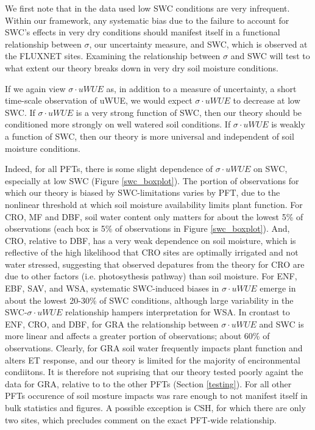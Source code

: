 \documentclass[draft,linenumbers]{agujournal}
\begin{document}
We first note that in the data used low SWC conditions are very infrequent. Within our framework, any systematic bias due to the  failure to account for SWC's effects in very dry conditions should manifest itself in a functional relationship between $\sigma$, our uncertainty measure, and SWC, which is observed at the FLUXNET sites. Examining the relationship between $\sigma$ and SWC will test to what extent our theory breaks down in very dry soil moisture conditions.

If we again view $\sigma \cdot uWUE$ as, in addition to a measure of uncertainty, a short time-scale observation of uWUE, we would expect $\sigma \cdot uWUE$ to decrease at low SWC. If $\sigma \cdot uWUE$ is a very strong function of SWC, then our theory should be conditioned more strongly on well watered soil conditions. If $\sigma \cdot uWUE$ is weakly a function of SWC, then our theory is more universal and independent of soil moisture conditions.

Indeed, for all PFTs, there is some slight dependence of $\sigma \cdot uWUE$ on SWC, especially at low SWC (Figure \ref{swc_boxplot}). The portion of observations for which our theory is biased by SWC-limitations varies by PFT, due to the nonlinear threshold at which soil moisture availability limits plant function. For CRO, MF and DBF, soil water content only matters for about the lowest 5\% of observations (each box is 5\% of observations in Figure \ref{swc_boxplot}). And, CRO, relative to DBF, has a very weak dependence on soil moisture, which is reflective of the high likelihood that CRO sites are optimally irrigated and not water stressed, suggesting that observed depatures from the theory for CRO are due to other factors (i.e. photosythesis pathway) than soil moisture. For ENF, EBF, SAV, and WSA, systematic SWC-induced biases in $\sigma \cdot uWUE$ emerge in about the lowest 20-30\% of SWC conditions, although large variability in the SWC-$\sigma \cdot uWUE$ relationship hampers interpretation for WSA. In crontast to ENF, CRO, and DBF, for GRA the relationship between $\sigma \cdot uWUE$ and SWC is more linear and affects a greater portion of observations; about 60\% of observations. Clearly, for GRA soil water frequently impacts plant function and alters ET response, and our theory is limited for the majority of encironmental condiitons. It is therefore not suprising that our theory tested poorly againt the data for GRA, relative to to the other PFTs (Section \ref{testing}). For all other PFTs occurence of soil mosture impacts was rare enough to not manifest itself in bulk statistics and figures. A possible exception is CSH, for which there are only two sites, which precludes comment on the exact PFT-wide relationship. 
\end{document}
